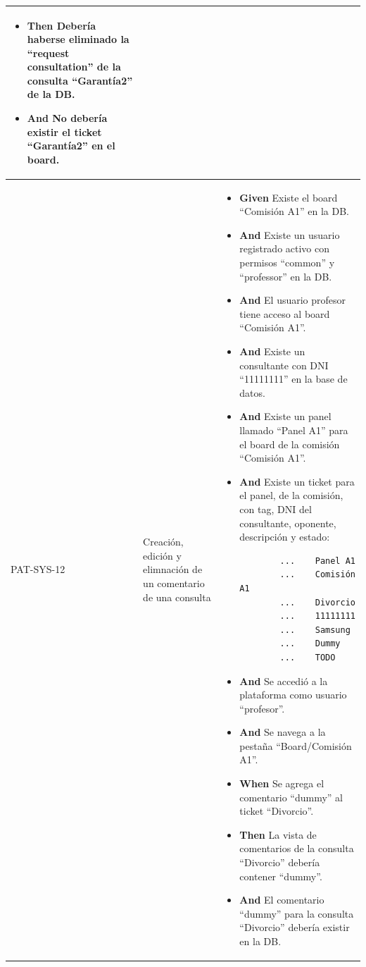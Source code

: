 \begin{longtable}{|p{1cm}|p{2.5cm}|p{12cm}|}
\begin{itemize}
        \item \textbf{Then} Debería haberse eliminado la ``request consultation'' de la consulta ``Garant\'ia2'' de la DB.
        \item \textbf{And} No debería existir el ticket ``Garant\'ia2'' en el board.
        \newline
    \end{itemize}
    \\ 
    \hline
     PAT-SYS-12 & Creación, edición y elimnación de un comentario de una consulta & 
        \begin{itemize}
        \item \textbf{Given} Existe el board ``Comisión A1'' en la DB.
        \item \textbf{And} Existe un usuario registrado activo con permisos ``common'' y ``professor'' en la DB.
        \item \textbf{And} El usuario profesor tiene acceso al board ``Comisión A1''.
        \item \textbf{And} Existe un consultante con DNI ``11111111'' en la base de datos.
        \item \textbf{And} Existe un panel llamado ``Panel A1'' para el board de la comisión ``Comisión A1''.
        \item \textbf{And} Existe un ticket para el panel, de la comisión, con tag, DNI del consultante, oponente, descripción y estado:
        \begin{verbatim}
        ...    Panel A1
        ...    Comisión A1
        ...    Divorcio
        ...    11111111
        ...    Samsung
        ...    Dummy
        ...    TODO
        \end{verbatim}
        \item \textbf{And} Se accedió a la plataforma como usuario ``profesor''.
        \item \textbf{And} Se navega a la pestaña ``Board/Comisión A1''.
        \newline
    
        \item \textbf{When} Se agrega el comentario ``dummy'' al ticket ``Divorcio''.
        \newline
    
        \item \textbf{Then} La vista de comentarios de la consulta ``Divorcio'' debería contener ``dummy''.
        \item \textbf{And} El comentario ``dummy'' para la consulta ``Divorcio'' debería existir en la DB.
        \newline


\end{itemize}
\end{longtable}

